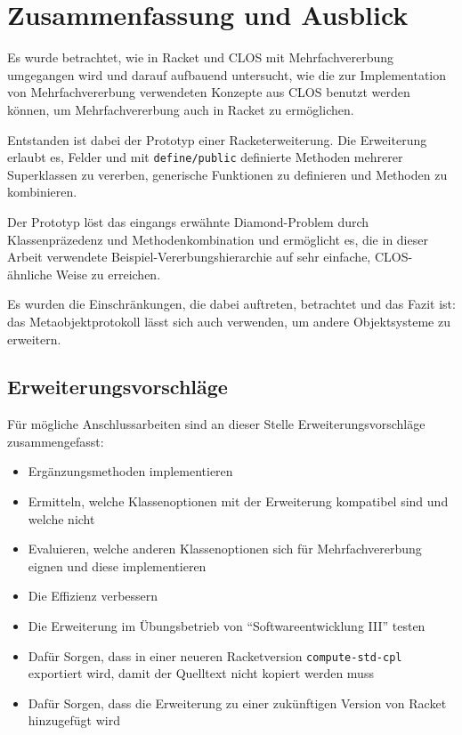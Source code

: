 \chapter{Zusammenfassung und Ausblick}
Es wurde betrachtet, wie in Racket und CLOS mit Mehrfachvererbung umgegangen wird und darauf aufbauend untersucht, wie die zur Implementation von Mehrfachvererbung verwendeten Konzepte aus CLOS benutzt werden können, um Mehrfachvererbung auch in Racket zu ermöglichen.

Entstanden ist dabei der Prototyp einer Racketerweiterung. Die Erweiterung erlaubt es, Felder und mit \texttt{define/public} definierte Methoden mehrerer Superklassen zu vererben, generische Funktionen zu definieren und Methoden zu kombinieren.

Der Prototyp löst das eingangs erwähnte Diamond-Problem durch Klassenpräzedenz und Methodenkombination und ermöglicht es, die in dieser Arbeit verwendete Beispiel-Vererbungshierarchie auf sehr einfache, CLOS-ähnliche Weise zu erreichen.

Es wurden die Einschränkungen, die dabei auftreten, betrachtet und das Fazit ist: das Metaobjektprotokoll lässt sich auch verwenden, um andere Objektsysteme zu erweitern.

\section{Erweiterungsvorschläge}

Für mögliche Anschlussarbeiten sind an dieser Stelle Erweiterungsvorschläge zusammengefasst:
\begin{itemize}
 \item Ergänzungsmethoden implementieren
 \item Ermitteln, welche Klassenoptionen mit der Erweiterung kompatibel sind und welche nicht
 \item Evaluieren, welche anderen Klassenoptionen sich für Mehrfachvererbung eignen und diese implementieren
 \item Die Effizienz verbessern
 \item Die Erweiterung im Übungsbetrieb von ``Softwareentwicklung III'' testen
 \item Dafür Sorgen, dass in einer neueren Racketversion \texttt{compute-std-cpl} exportiert wird, damit der Quelltext nicht kopiert werden muss
 \item Dafür Sorgen, dass die Erweiterung zu einer zukünftigen Version von Racket hinzugefügt wird 
\end{itemize}